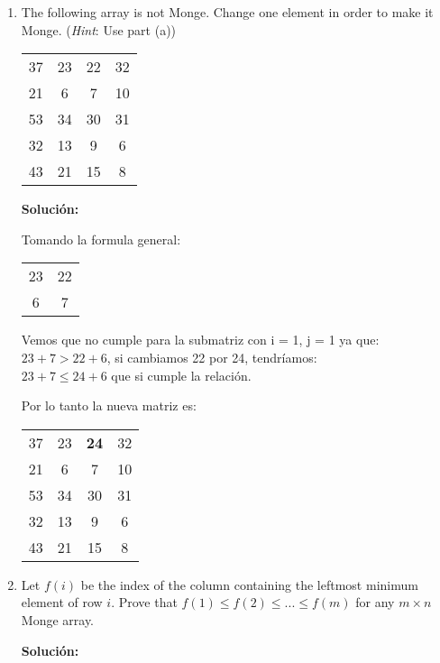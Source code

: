 \documentclass{article}
\begin{document}
\begin{enumerate}[label=\textbf{\alph*.}]
  \item The following array is not Monge. Change one element in order to make it Monge. (\emph{Hint}: Use part (a))

    \begin{tabular}{cccc}
    37 &23& 22& 32 \\
    21 &6 &7 &10\\
    53 &34 &30 &31\\
    32 &13 &9 &6\\
    43 &21 &15 &8\\
    \end{tabular}

	  \textbf{Solución:}
      
      Tomando la formula general:
      
        \begin{tabular}{cc}
          23& 22 \\
          6 &7 \\
        \end{tabular}
        
      Vemos que no cumple para la submatriz con i = 1, j = 1 ya que:\\
      $23+7 > 22+6$, si cambiamos 22 por 24, tendríamos:\\
      $23+7 \leq 24+6$ que si cumple la relación.
      
      Por lo tanto la nueva matriz es:
      
       \begin{tabular}{cccc}
        37 &23& \textbf{24}& 32 \\
        21 &6 &7 &10\\
        53 &34 &30 &31\\
        32 &13 &9 &6\\
        43 &21 &15 &8\\
        \end{tabular}
      

  \item Let $f(i)$ be the index of the column containing the leftmost minimum element of row $i$. Prove that $f(1) \leq f(2) \leq ... \leq f(m)$ for any $m \times n$ Monge array.
  
  \textbf{Solución:}
  

\end{enumerate}
\end{document}
